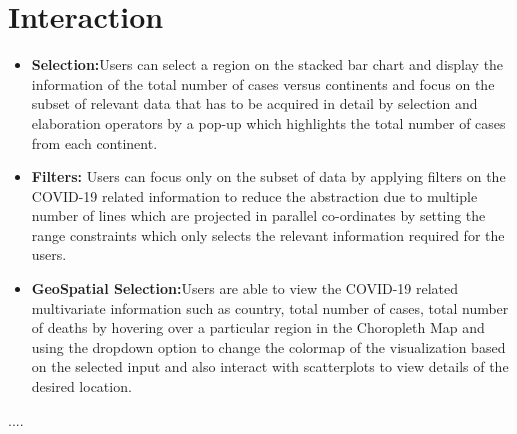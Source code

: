 \documentclass[10pt]{article}
\begin{document}
\section{Interaction}
\begin{itemize}
    \item \textbf{Selection:}Users can select a region on the stacked bar chart and display the information of the total number of cases versus continents and focus on the subset of relevant data that has to be acquired in detail by selection and elaboration operators by a pop-up which highlights the total number of cases from each continent.   
    \item \textbf{Filters:} Users can focus only on the subset of data by applying filters on the COVID-19 related information to reduce the abstraction due to multiple number of lines which are projected in parallel co-ordinates by setting the range constraints which only selects the relevant information required for the users.
    \item \textbf{GeoSpatial Selection:}Users are able to view the COVID-19 related multivariate information such as country, total number of cases, total number of deaths by hovering over a particular region in the Choropleth Map and using the dropdown option to change the colormap of the visualization based on the selected input and also interact with scatterplots to view details of the desired location.
\end{itemize}

....




%
%
\end{document}
